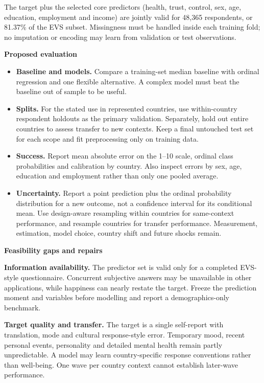 \documentclass[10pt,a4paper]{article}
\newcommand{\Subsection}[1]{%
  \vspace{2pt}%
  {\fontsize{9.3}{10.3}\selectfont\bfseries\color{Navy}#1}\par
}
\newenvironment{CompactItemize}{%
  \begin{itemize}%
  \setlength{\itemsep}{1.5pt}%
  \setlength{\topsep}{2pt}%
  \setlength{\parsep}{0pt}%
  \setlength{\parskip}{0pt}%
}{\end{itemize}}
\begin{document}
The target plus the selected core predictors (health, trust, control, sex, age, education, employment and income) are jointly valid for 48,365 respondents, or 81.37\% of the EVS subset. Missingness must be handled inside each training fold; no imputation or encoding may learn from validation or test observations.

\Subsection{Proposed evaluation}
\begin{CompactItemize}
  \item \textbf{Baseline and models.} Compare a training-set median baseline with ordinal regression and one flexible alternative. A complex model must beat the baseline out of sample to be useful.
  \item \textbf{Splits.} For the stated use in represented countries, use within-country respondent holdouts as the primary validation. Separately, hold out entire countries to assess transfer to new contexts. Keep a final untouched test set for each scope and fit preprocessing only on training data.
  \item \textbf{Success.} Report mean absolute error on the 1--10 scale, ordinal class probabilities and calibration by country. Also inspect errors by sex, age, education and employment rather than only one pooled average.
  \item \textbf{Uncertainty.} Report a point prediction plus the ordinal probability distribution for a new outcome, not a confidence interval for its conditional mean. Use design-aware resampling within countries for same-context performance, and resample countries for transfer performance. Measurement, estimation, model choice, country shift and future shocks remain.
\end{CompactItemize}

\Subsection{Feasibility gaps and repairs}
\textbf{Information availability.} The predictor set is valid only for a completed EVS-style questionnaire. Concurrent subjective answers may be unavailable in other applications, while happiness can nearly restate the target. Freeze the prediction moment and variables before modelling and report a demographics-only benchmark.

\textbf{Target quality and transfer.} The target is a single self-report with translation, mode and cultural response-style error. Temporary mood, recent personal events, personality and detailed mental health remain partly unpredictable. A model may learn country-specific response conventions rather than well-being. One wave per country context cannot establish later-wave performance.
\end{document}
